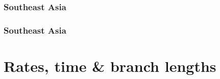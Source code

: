 {
\begin{frame}
    \frametitle{Southeast Asia}    
\end{frame}
}

{
\begin{frame}
    \frametitle{Southeast Asia}    
\end{frame}
}

\section{Rates, time \& branch lengths}

